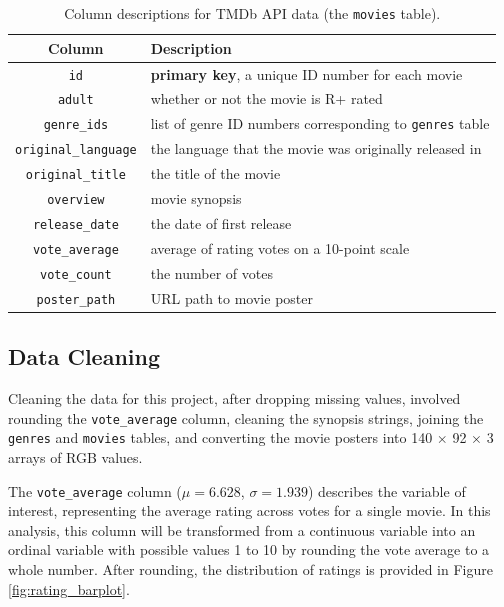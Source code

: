 \documentclass[12pt, oneside]{article}   	%
\begin{document}
\begin{table}
\begin{center}\begin{tabular}{c|l}
\textbf{Column} & \textbf{Description} \\ \hline
\texttt{id} & \textbf{primary key}, a unique ID number for each movie \\
\texttt{adult} & whether or not the movie is R+ rated \\
\texttt{genre\_ids} & list of genre ID numbers corresponding to \texttt{genres} table \\
\texttt{original\_language} & the language that the movie was originally released in \\
\texttt{original\_title} & the title of the movie \\
\texttt{overview} & movie synopsis \\
\texttt{release\_date} & the date of first release \\
\texttt{vote\_average} & average of rating votes on a 10-point scale \\
\texttt{vote\_count} & the number of votes \\
\texttt{poster\_path} & URL path to movie poster \\
\end{tabular}\end{center}
\caption{\label{table:cols_of_interest}Column descriptions for TMDb API data (the \texttt{movies} table).}
\end{table}

\subsection{Data Cleaning}

Cleaning the data for this project, after dropping missing values, involved rounding the \texttt{vote\_average} column, cleaning the synopsis strings, joining the \texttt{genres} and \texttt{movies} tables, and converting the movie posters into 140 $\times$ 92 $\times$ 3 arrays of RGB values.

The \texttt{vote\_average} column ($\mu = 6.628$, $\sigma = 1.939$) describes the variable of interest, representing the average rating across votes for a single movie. In this analysis, this column will be transformed from a continuous variable into an ordinal variable with possible values 1 to 10 by rounding the vote average to a whole number. After rounding, the distribution of ratings is provided in Figure \ref{fig:rating_barplot}.
\end{document}
